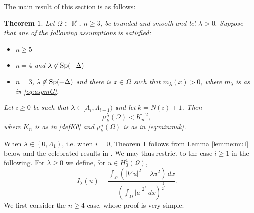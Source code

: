 \documentclass[10pt]{amsart}
\numberwithin{equation}{section}
\newcommand{\R}{\mathbb{R}}
\newcommand{\Sp}{{\rm Sp}}
\newcommand{\Om}{\Omega}
\newcommand{\mkl}{\mu_{k}^{\lambda}}
\def \crit{2^{*}}
\theoremstyle{plain}
\newtheorem{theo}{Theorem}[section]%
\theoremstyle{remark}
\begin{document}
\medskip

The main result of this section is as follows:
 
 
 \begin{theo}\label{prop:test:func}
 Let $\Om \subset \R^n$, $n \ge 3$, be bounded and smooth and let  $\lambda >0$. Suppose that one of the following assumptions is satisfied: 
\begin{itemize}
\item $n\ge5$ 
\item $n=4$ and $\lambda \not \in \Sp(-\Delta)$
\item  $n=3$, $\lambda \not \in \Sp(-\Delta)$ and there is $x \in \Om$ such that $m_\lambda(x) >0$, where $m_{\lambda}$ is as in \eqref{eq:asymG}. 
\end{itemize}
Let $i \ge0$ be such that $\lambda \in [\Lambda_i, \Lambda_{i+1})$ and let $k = N(i)+1$. Then
 	\begin{equation} \label{eq:test12}
 		\mkl(\Om) < K_n^{-2},
 	\end{equation}
where $K_n$ is as in \eqref{defK0} and $\mkl(\Om)$ is as in \eqref{eq:minmuk}.  
 \end{theo}
When $\lambda \in(0, \Lambda_1)$, i.e. when $i=0$, Theorem  \ref{prop:test:func} follows from Lemma \ref{lemme:muI} below and the celebrated results in \cite{BN, Druetdim3}. We may thus restrict to the case $i \ge 1$ in the following. For  $\lambda \ge 0$ we define, for $u \in H_0^1(\Om)$,
\begin{equation}\label{eq:Jlambdap}
	J_\lambda(u)= \frac{\int_\Om \left( |\nabla u|^2-\lambda u^2\right)\, dx}{\left( \int_\Om |u|^{\crit}\, dx\right) ^{\frac{2}{\crit}}}.
\end{equation}
We first consider the $n\ge 4$ case, whose proof is very simple:
\end{document}
